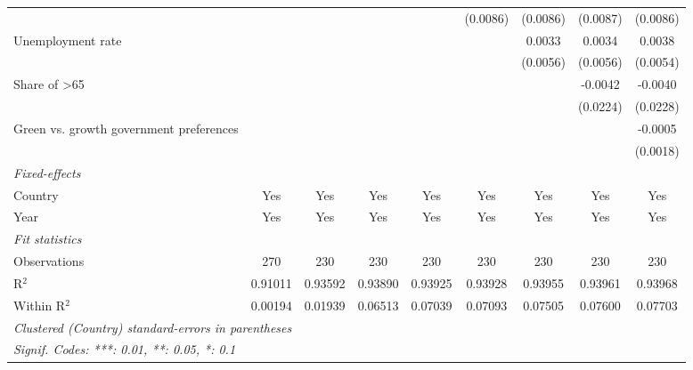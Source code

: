 \begin{table}[htbp]
\begin{tabular}{lcccccccc}
                                                             &          &          &                &                & (0.0086)       & (0.0086)       & (0.0087)       & (0.0086)\\   
      Unemployment rate                                      &          &          &                &                &                & 0.0033         & 0.0034         & 0.0038\\   
                                                             &          &          &                &                &                & (0.0056)       & (0.0056)       & (0.0054)\\   
      Share of >65                                           &          &          &                &                &                &                & -0.0042        & -0.0040\\   
                                                             &          &          &                &                &                &                & (0.0224)       & (0.0228)\\   
      Green vs. growth government preferences                &          &          &                &                &                &                &                & -0.0005\\   
                                                             &          &          &                &                &                &                &                & (0.0018)\\   
      \midrule
      \emph{Fixed-effects}\\
      Country                                                & Yes      & Yes      & Yes            & Yes            & Yes            & Yes            & Yes            & Yes\\  
      Year                                                   & Yes      & Yes      & Yes            & Yes            & Yes            & Yes            & Yes            & Yes\\  
      \midrule
      \emph{Fit statistics}\\
      Observations                                           & 270      & 230      & 230            & 230            & 230            & 230            & 230            & 230\\  
      R$^2$                                                  & 0.91011  & 0.93592  & 0.93890        & 0.93925        & 0.93928        & 0.93955        & 0.93961        & 0.93968\\  
      Within R$^2$                                           & 0.00194  & 0.01939  & 0.06513        & 0.07039        & 0.07093        & 0.07505        & 0.07600        & 0.07703\\  
      \midrule \midrule
      \multicolumn{9}{l}{\emph{Clustered (Country) standard-errors in parentheses}}\\
      \multicolumn{9}{l}{\emph{Signif. Codes: ***: 0.01, **: 0.05, *: 0.1}}\\
   \end{tabular}
\end{table}


